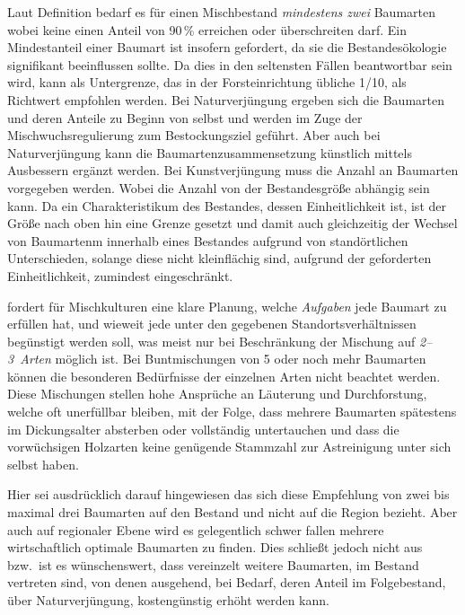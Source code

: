 \documentclass[twocolumn]{scrartcl}
\begin{document}
Laut Definition bedarf es für einen Mischbestand \emph{mindestens
  zwei} Baumarten wobei keine einen Anteil von 90\,\% erreichen oder
überschreiten darf. Ein Mindestanteil einer Baumart ist insofern
gefordert, da sie die Bestandesökologie signifikant beeinflussen
sollte. Da dies in den seltensten Fällen beantwortbar sein wird, kann
als Untergrenze, das in der Forsteinrichtung übliche 1/10, als
Richtwert empfohlen werden. Bei Naturverjüngung ergeben sich die
Baumarten und deren Anteile zu Beginn von selbst und werden im Zuge
der Mischwuchsregulierung zum Bestockungsziel geführt. Aber auch bei
Naturverjüngung kann die Baumartenzusammensetzung künstlich mittels
Ausbessern ergänzt werden. Bei Kunstverjüngung muss die Anzahl an
Baumarten vorgegeben werden. Wobei die Anzahl von der Bestandesgröße
abhängig sein kann. Da ein Charakteristikum des Bestandes, dessen
Einheitlichkeit ist, ist der Größe nach oben hin eine Grenze gesetzt
und damit auch gleichzeitig der Wechsel von Baumartenm innerhalb eines
Bestandes aufgrund von standörtlichen Unterschieden, solange diese
nicht kleinflächig sind, aufgrund der geforderten Einheitlichkeit,
zumindest eingeschränkt.

\cite[S.~218--219]{wiedemann1951Ertragskunde} fordert für
Mischkulturen \frqq eine klare Planung, welche \emph{Aufgaben} jede
Baumart zu erfüllen hat, und wieweit jede unter den gegebenen
Standortsverhältnissen begünstigt werden soll, was meist nur bei
Beschränkung der Mischung auf \emph{2--3~Arten} möglich ist. Bei
Buntmischungen von 5 oder noch mehr Baumarten können die besonderen
Bedürfnisse der einzelnen Arten nicht beachtet werden. Diese
Mischungen stellen hohe Ansprüche an Läuterung und Durchforstung,
welche oft unerfüllbar bleiben, mit der Folge, dass mehrere Baumarten
spätestens im Dickungsalter absterben oder vollständig untertauchen
und dass die vorwüchsigen Holzarten keine genügende Stammzahl zur
Astreinigung unter sich selbst haben.\flqq{}

Hier sei ausdrücklich darauf hingewiesen das sich diese Empfehlung von
zwei bis maximal drei Baumarten auf den Bestand und nicht auf die
Region bezieht. Aber auch auf regionaler Ebene wird es gelegentlich
schwer fallen mehrere wirtschaftlich optimale Baumarten zu finden.
Dies schließt jedoch nicht aus bzw.\ ist es wünschenswert, dass
vereinzelt weitere Baumarten, im Bestand vertreten sind, von denen
ausgehend, bei Bedarf, deren Anteil im Folgebestand, über
Naturverjüngung, kostengünstig erhöht werden kann.
\end{document}
